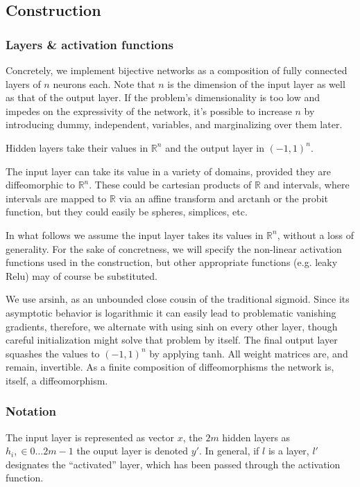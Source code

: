 \documentclass{article}
\begin{document}
\subsection{Construction}

\subsubsection{Layers \& activation functions}

Concretely, we implement bijective networks as a composition of fully
connected layers of \(n\) neurons each. Note that \(n\) is the dimension of
the input layer as well as that of the output layer. If the problem's
dimensionality is too low and impedes on the expressivity of the network,
it's possible to increase \(n\) by introducing dummy, independent, variables,
and marginalizing over them later.

Hidden layers take their values in \(\mathbb{R}^n\) and the output layer in
\((-1,1)^n\).

The input layer can take its value in a variety of domains,
provided they are diffeomorphic to \(\mathbb{R}^n\). These could be cartesian
products of \(\mathbb{R}\) and intervals, where intervals are mapped to
\(\mathbb{R}\) via an affine transform and \(\mathrm{arctanh}\) or the probit
function, but they could easily be spheres, simplices, etc.

In what follows we assume the input layer takes its values in \(\mathbb{R}^n\),
without a loss of generality. For the sake of concretness, we will specify the
non-linear activation functions used in the construction, but other appropriate
functions (e.g. leaky Relu) may of course be substituted.

We use \(\mathrm{arsinh}\), as an unbounded close cousin of the traditional
sigmoid. Since its asymptotic behavior is logarithmic it can easily lead to
problematic vanishing gradients, therefore, we alternate with using
\(\mathrm{sinh}\) on every other layer, though careful initialization might
solve that problem by itself. The final output layer squashes the values to
\((-1,1)^n\) by applying \(\mathrm{tanh}\). All weight matrices are,
and remain, invertible. As a finite composition of diffeomorphisms the network
is, itself, a diffeomorphism.

\subsubsection{Notation}

The input layer is represented as vector \(x\), the \(2m\) hidden layers as
\(h_i, \in 0 \ldots 2m-1 \) the ouput layer is denoted \(y'\). In general,
if \(l\) is a layer, \(l'\) designates the ``activated'' layer, which has been
passed through the activation function.
\end{document}
